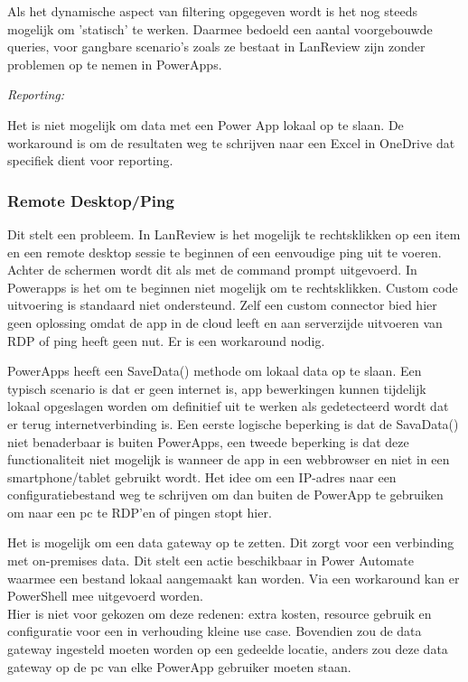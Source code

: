 Als het dynamische aspect van filtering opgegeven wordt is het nog steeds mogelijk om 'statisch' te werken. Daarmee bedoeld een aantal voorgebouwde queries, voor gangbare scenario's zoals ze bestaat in LanReview zijn zonder problemen op te nemen in PowerApps.

\textit{Reporting:}

Het is niet mogelijk om data met een Power App lokaal op te slaan. De workaround is om de resultaten weg te schrijven naar een Excel in OneDrive dat specifiek dient voor reporting.

\subsubsection{Remote Desktop/Ping}
\label{subsec:rdp-ping}

Dit stelt een probleem. In LanReview is het mogelijk te rechtsklikken op een item en een remote desktop sessie te beginnen of een eenvoudige ping uit te voeren. Achter de schermen wordt dit als met de command prompt uitgevoerd. In Powerapps is het om te beginnen niet mogelijk om te rechtsklikken. Custom code uitvoering is standaard niet ondersteund. Zelf een custom connector bied hier geen oplossing omdat de app in de cloud leeft en aan serverzijde uitvoeren van RDP of ping heeft geen nut. Er is een workaround nodig.

PowerApps heeft een SaveData() methode om lokaal data op te slaan. Een typisch scenario is dat er geen internet is, app bewerkingen kunnen tijdelijk lokaal opgeslagen worden om definitief uit te werken als gedetecteerd wordt dat er terug internetverbinding is. Een eerste logische beperking is dat de SavaData() niet benaderbaar is buiten PowerApps, een tweede beperking is dat deze functionaliteit niet mogelijk is wanneer de app in een webbrowser en niet in een smartphone/tablet gebruikt wordt. Het idee om een IP-adres naar een configuratiebestand weg te schrijven om dan buiten de PowerApp te gebruiken om naar een pc te RDP'en of pingen stopt hier.

Het is mogelijk om een data gateway op te zetten. Dit zorgt voor een verbinding met on-premises data. Dit stelt een actie beschikbaar in Power Automate waarmee een bestand lokaal aangemaakt kan worden. Via een workaround kan er PowerShell mee uitgevoerd worden. \autocite{Luca2017}\\
Hier is niet voor gekozen om deze redenen: extra kosten, resource gebruik en configuratie voor een in verhouding kleine use case. Bovendien zou de data gateway ingesteld moeten worden op een gedeelde locatie, anders zou deze data gateway op de pc van elke PowerApp gebruiker moeten staan.

